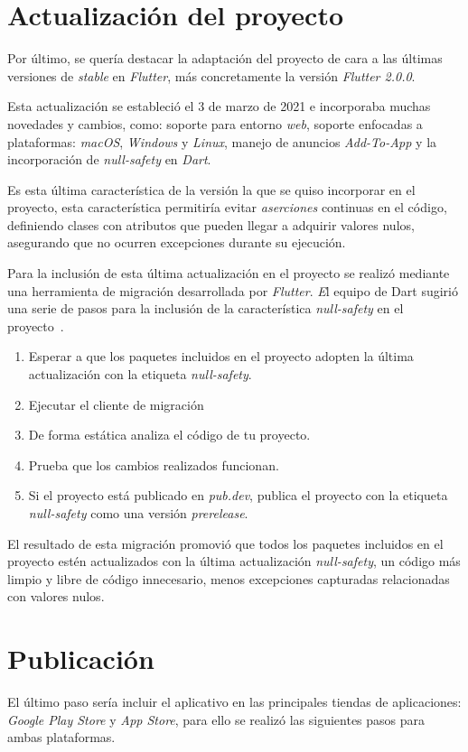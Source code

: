 \section{Actualización del proyecto}
Por último, se quería destacar la adaptación del proyecto de cara a las últimas
versiones de \textit{stable} en \textit{Flutter}, más concretamente la versión \textit{Flutter 2.0.0}.

Esta actualización se estableció el 3 de marzo de 2021 e incorporaba muchas novedades y
cambios, como: soporte para entorno \textit{web}, soporte enfocadas a plataformas:
\textit{macOS}, \textit{Windows} y \textit{Linux}, manejo de anuncios \textit{Add-To-App}
y la incorporación de \textit{null-safety} en \textit{Dart}.

Es esta última característica de la versión la que se quiso incorporar en el proyecto,
esta característica permitiría evitar \textit{aserciones} continuas en el código,
definiendo clases con atributos que pueden llegar a adquirir valores nulos, asegurando
que no ocurren excepciones durante su ejecución.

Para la inclusión de esta última actualización en el proyecto se realizó mediante
una herramienta de migración desarrollada por \textit{Flutter}.
\textit El equipo de {Dart} sugirió una serie de pasos para la inclusión de la característica \textit{null-safety}
en el proyecto~\cite{dartmigrate}.

\begin{enumerate}
    \item Esperar a que los paquetes incluidos en el proyecto adopten la última
    actualización con la etiqueta \textit{null-safety}.
    \item Ejecutar el cliente de migración  
    \item De forma estática analiza el código de tu proyecto.
    \item Prueba que los cambios realizados funcionan.
    \item Si el proyecto está publicado en \textit{pub.dev}, publica el proyecto con
    la etiqueta \textit{null-safety} como una versión \textit{prerelease}.
\end{enumerate}

El resultado de esta migración promovió que todos los paquetes incluidos en el
proyecto estén actualizados con la última actualización \textit{null-safety},
un código más limpio y libre de código innecesario, menos excepciones capturadas relacionadas
con valores nulos.

\section{Publicación}
El último paso sería incluir el aplicativo en las principales tiendas de aplicaciones:
\textit{Google Play Store} y \textit{App Store}, para ello se realizó las siguientes pasos
para ambas plataformas.

